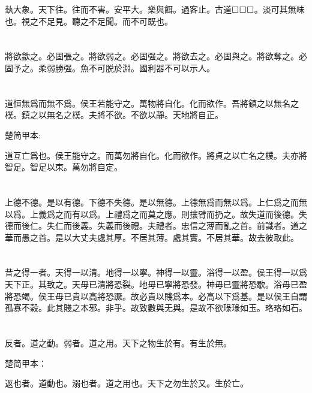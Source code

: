 \documentclass[a5paper]{ctexbook}
\begin{document}
    埶大象。天下往。往而不害。安平大。樂與餌。過客止。古道☐☐☐。淡可其無味也。視之不足見。聽之不足聞。而不可既也。

    \chapter{}

    將欲歙之。必固張之。將欲弱之。必固强之。將欲去之。必固與之。將欲奪之。必固予之。柔弱勝强。魚不可脱於淵。國利器不可以示人。

    \chapter{}

    道恒無爲而無不爲。侯王若能守之。萬物將自化。化而欲作。吾將鎮之以無名之樸。鎮之以無名之樸。夫將不欲。不欲以靜。天地將自正。

    楚简甲本:

    道互亡爲也。侯王能守之。而萬勿將自化。化而欲作。將貞之以亡名之樸。夫亦將智足。智足以朿。萬勿將自定。

    \chapter{}

    上德不德。是以有德。下德不失德。是以無德。上德無爲而無以爲。上仁爲之而無以爲。上義爲之而有以爲。上禮爲之而莫之應。則攘臂而扔之。故失道而後德。失德而後仁。失仁而後義。失義而後禮。夫禮者。忠信之薄而亂之首。前識者。道之華而愚之首。是以大丈夫處其厚。不居其薄。處其實。不居其華。故去彼取此。

    \chapter{}

    昔之得一者。天得一以清。地得一以寧。神得一以靈。浴得一以盈。侯王得一以爲天下正。其致之。天毋已清將恐裂。地毋已寧將恐發。神毋已靈將恐歇。浴毋已盈將恐竭。侯王毋已貴以高將恐蹶。故必貴以賤爲本。必高以下爲基。是以侯王自謂孤寡不穀。此其賤之本邪。非乎。故致數與无與。是故不欲琭琭如玉。珞珞如石。

    \chapter{}

    反者。道之動。弱者。道之用。天下之物生於有。有生於無。

    楚简甲本：

    返也者。道動也。溺也者。道之用也。天下之勿生於又。生於亡。
\end{document}
